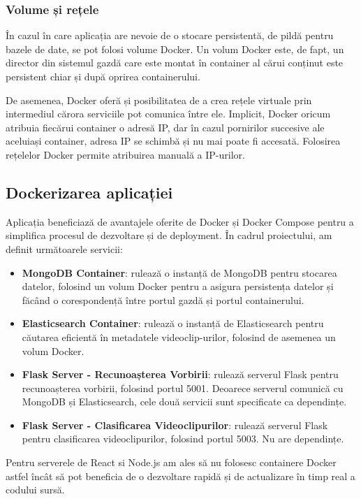 \subsubsection{Volume și rețele}
\par
În cazul în care aplicația are nevoie de o stocare persistentă, de pildă pentru bazele de date, se pot
folosi volume Docker. Un volum Docker este, de fapt, un director din sistemul gazdă care este montat în
container al cărui conținut este persistent chiar și după oprirea containerului.

\par
De asemenea, Docker oferă și posibilitatea de a crea rețele virtuale prin intermediul cărora serviciile
pot comunica între ele. Implicit, Docker oricum atribuia fiecărui container o adresă IP, dar în cazul
pornirilor succesive ale aceluiași container, adresa IP se schimbă și nu mai poate fi accesată. Folosirea
rețelelor Docker permite atribuirea manuală a IP-urilor.

\subsection{Dockerizarea aplicației}
\par
Aplicația beneficiază de avantajele oferite de Docker și Docker Compose pentru a simplifica procesul
de dezvoltare și de deployment. În cadrul proiectului, am definit următoarele servicii:

\begin{itemize}
    \item \textbf{MongoDB Container}: rulează o instanță de MongoDB pentru stocarea datelor, folosind
    un volum Docker pentru a asigura persistența datelor și făcând o corespondență între portul gazdă
    și portul containerului.
    \item \textbf{Elasticsearch Container}: rulează o instanță de Elasticsearch pentru căutarea eficientă
    în metadatele videoclip-urilor, folosind de asemenea un volum Docker.
    \item \textbf{Flask Server - Recunoașterea Vorbirii}: rulează serverul Flask pentru recunoașterea
    vorbirii, folosind portul 5001. Deoarece serverul comunică cu MongoDB și Elasticsearch, cele două
    servicii sunt specificate ca dependințe.
    \item \textbf{Flask Server - Clasificarea Videoclipurilor}: rulează serverul Flask pentru clasificarea
    videoclipurilor, folosind portul 5003. Nu are dependințe.
\end{itemize}

\par
Pentru serverele de React si Node.js am ales să nu folosesc containere Docker astfel încât să pot
beneficia de o dezvoltare rapidă și de actualizare în timp real a codului sursă.

